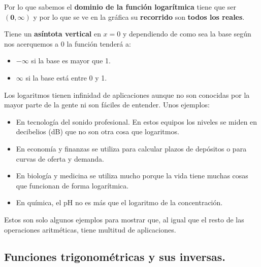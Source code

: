 \documentclass[a4paper,11pt,answers]{exam}
\begin{document}
Por lo que sabemos el \textbf{dominio de la función logarítmica} tiene que ser $\boldsymbol{(0, \infty)}$ y por lo que se ve en la gráfica su \textbf{recorrido} son \textbf{todos los reales}.

Tiene un \textbf{asíntota vertical} en $x=0$ y dependiendo de como sea la base según nos acerquemos a 0 la función tenderá a:
\begin{itemize}
	\item $-\infty$ si la base es mayor que 1.
	\item $\infty$ si la base está entre 0 y 1.
\end{itemize}

Los logaritmos tienen infinidad de aplicaciones aunque no son conocidas por la mayor parte de la gente ni son fáciles de entender. Unos ejemplos:
\begin{itemize}
	\item En tecnología del sonido profesional. En estos equipos los niveles se miden en decibelios (dB) que no son otra cosa que logaritmos.
	\item En economía y finanzas se utiliza para calcular plazos de depósitos o para curvas de oferta y demanda.
	\item En biología y medicina se utiliza mucho porque la vida tiene muchas cosas que funcionan de forma logarítmica.
	\item En química, el pH no es más que el logaritmo de la concentración.
\end{itemize}
Estos son solo algunos ejemplos para mostrar que, al igual que el resto de las operaciones aritméticas, tiene multitud de aplicaciones.

\subsection{Funciones trigonométricas y sus inversas.}
\end{document}
